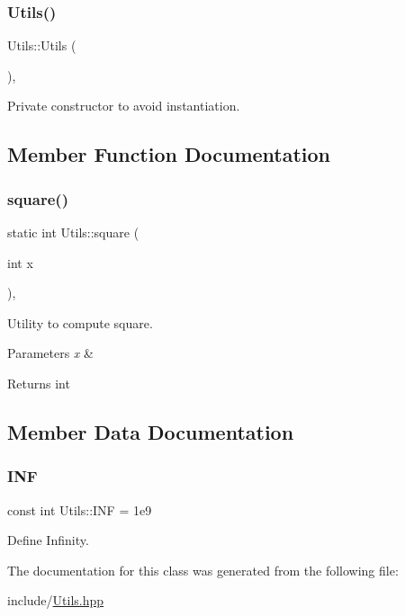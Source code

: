 \subsubsection{\texorpdfstring{Utils()}{Utils()}}
{\footnotesize\ttfamily Utils\+::\+Utils (\begin{DoxyParamCaption}{ }\end{DoxyParamCaption})\hspace{0.3cm}{\ttfamily [inline]}, {\ttfamily [private]}}



Private constructor to avoid instantiation. 



\subsection{Member Function Documentation}
\mbox{\label{classUtils_a4a82c02c4e80280dc05f15f9c2277413}} 
\subsubsection{\texorpdfstring{square()}{square()}}
{\footnotesize\ttfamily static int Utils\+::square (\begin{DoxyParamCaption}\item[{int}]{x }\end{DoxyParamCaption})\hspace{0.3cm}{\ttfamily [inline]}, {\ttfamily [static]}}



Utility to compute square. 


\begin{DoxyParams}{Parameters}
{\em x} & \\
\hline
\end{DoxyParams}
\begin{DoxyReturn}{Returns}
int 
\end{DoxyReturn}


\subsection{Member Data Documentation}
\mbox{\label{classUtils_ade3d4413a974dbaa25f1619a4516946b}} 
\subsubsection{\texorpdfstring{I\+NF}{INF}}
{\footnotesize\ttfamily const int Utils\+::\+I\+NF = 1e9\hspace{0.3cm}{\ttfamily [static]}}



Define Infinity. 



The documentation for this class was generated from the following file\+:\begin{DoxyCompactItemize}
\item 
include/\mbox{\hyperlink{Utils_8hpp}{Utils.\+hpp}}\end{DoxyCompactItemize}
